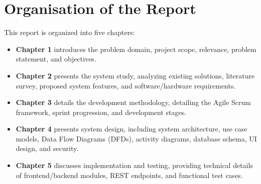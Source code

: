 \section{Organisation of the Report}
This report is organized into five chapters:
\begin{itemize}
    \item \textbf{Chapter 1} introduces the problem domain, project scope, relevance, problem statement, and objectives.
    \item \textbf{Chapter 2} presents the system study, analyzing existing solutions, literature survey, proposed system features, and software/hardware requirements.
    \item \textbf{Chapter 3} details the development methodology, detailing the Agile Scrum framework, sprint progression, and development stages.
    \item \textbf{Chapter 4} presents system design, including system architecture, use case models, Data Flow Diagrams (DFDs), activity diagrams, database schema, UI design, and security.
    \item \textbf{Chapter 5} discusses implementation and testing, providing technical details of frontend/backend modules, REST endpoints, and functional test cases.
\end{itemize}

\clearpage
